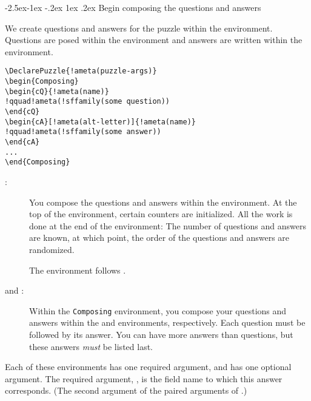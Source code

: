 \documentclass{article}
\makeatletter
\renewcommand\subsection{%
   \renewcommand{\@seccntformat}[1]{\csname the##1\endcsname.\enspace}%
   \@startsection{subsection}{2}{-42.5pt}%
   {-2.5ex\@plus -1ex \@minus -.2ex}%
   {1ex \@plus .2ex}%
   {\noindent\normalfont\normalsize\bfseries\color{blue}}}
\makeatother
\begin{document}
\subsection{Begin composing the questions and answers}\label{composing}

We create questions and answers for the puzzle within the 
environment. Questions are posed within the  environment and answers
are written within the  environment.
\begin{Verbatim}[xleftmargin=\amtIndent,commandchars=!()]
\DeclarePuzzle{!ameta(puzzle-args)}
\begin{Composing}
\begin{cQ}{!ameta(name)}
!qquad!ameta(!sffamily(some question))
\end{cQ}
\begin{cA}[!ameta(alt-letter)]{!ameta(name)}
!qquad!ameta(!sffamily(some answer))
\end{cA}
...
\end{Composing}
\end{Verbatim}
\begin{description}
\item[\normalfont{}:] You compose the questions and
    answers within the  environment. At the top of
    the environment, certain counters are initialized. All the work
    is done at the end of the environment: The number of questions
    and answers are known, at which point, the order of the
    questions and answers are randomized.

    The  environment follows .

\item[\normalfont{} and :] Within the
    \texttt{Composing} environment, you compose your questions and
    answers within the  and  environments,
    respectively.  Each question must be followed by its answer.
    You can have more answers than questions, but these answers
    \emph{must} be listed last.
\end{description}
Each of these environments has one required argument, and  has one
optional argument. The required argument, , is the field name to
which this answer corresponds. (The second argument of the paired arguments
of .)
\end{document}
